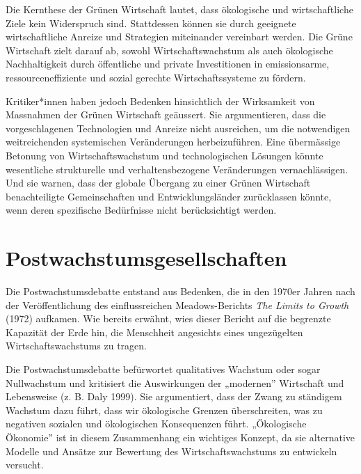 \documentclass[
  nswissgerman,
  a4paper,
  DIV=11,
  numbers=noendperiod,
  oneside,
  openany]{scrreprt}
\begin{document}
Die Kernthese der Grünen Wirtschaft lautet, dass ökologische und
wirtschaftliche Ziele kein Widerspruch sind. Stattdessen können sie
durch geeignete wirtschaftliche Anreize und Strategien miteinander
vereinbart werden. Die Grüne Wirtschaft zielt darauf ab, sowohl
Wirtschaftswachstum als auch ökologische Nachhaltigkeit durch
öffentliche und private Investitionen in emissionsarme,
ressourceneffiziente und sozial gerechte Wirtschaftssysteme zu fördern.

Kritiker*innen haben jedoch Bedenken hinsichtlich der Wirksamkeit von
Massnahmen der Grünen Wirtschaft geäussert. Sie argumentieren, dass die
vorgeschlagenen Technologien und Anreize nicht ausreichen, um die
notwendigen weitreichenden systemischen Veränderungen herbeizuführen.
Eine übermässige Betonung von Wirtschaftswachstum und technologischen
Lösungen könnte wesentliche strukturelle und verhaltensbezogene
Veränderungen vernachlässigen. Und sie warnen, dass der globale Übergang
zu einer Grünen Wirtschaft benachteiligte Gemeinschaften und
Entwicklungsländer zurücklassen könnte, wenn deren spezifische
Bedürfnisse nicht berücksichtigt werden.

\section{Postwachstumsgesellschaften}\label{postwachstumsgesellschaften}

Die Postwachstumsdebatte entstand aus Bedenken, die in den 1970er Jahren
nach der Veröffentlichung des einflussreichen Meadows-Berichts \emph{The
Limits to Growth} (1972) aufkamen. Wie bereits erwähnt, wies dieser
Bericht auf die begrenzte Kapazität der Erde hin, die Menschheit
angesichts eines ungezügelten Wirtschaftswachstums zu tragen.

Die Postwachstumsdebatte befürwortet qualitatives Wachstum oder sogar
Nullwachstum und kritisiert die Auswirkungen der „modernen'' Wirtschaft
und Lebensweise (z. B. Daly 1999). Sie argumentiert, dass der Zwang zu
ständigem Wachstum dazu führt, dass wir ökologische Grenzen
überschreiten, was zu negativen sozialen und ökologischen Konsequenzen
führt. „Ökologische Ökonomie'' ist in diesem Zusammenhang ein wichtiges
Konzept, da sie alternative Modelle und Ansätze zur Bewertung des
Wirtschaftswachstums zu entwickeln versucht.
\end{document}
